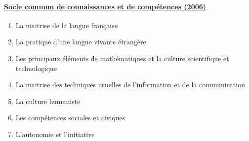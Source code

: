 \documentclass[10pt,french,twocolumn,landscape,a4paper]{article}
\begin{document}
\paragraph{\href{http://www.education.gouv.fr/cid2770/le-socle-commun-de-connaissances-et-de-competences.html}{Socle commun de connaissances et de compétences (2006)}}
\begin{enumerate}
\item La maitrise de la langue française
\item La pratique d’une langue vivante étrangère
\item Les principaux éléments de mathématiques et la culture scientifique et technologique
\item La maitrise des techniques usuelles de l’information et de la communication
\item La culture humaniste
\item Les compétences sociales et civiques
\item L’autonomie et l’initiative
\end{enumerate}
\end{document}
